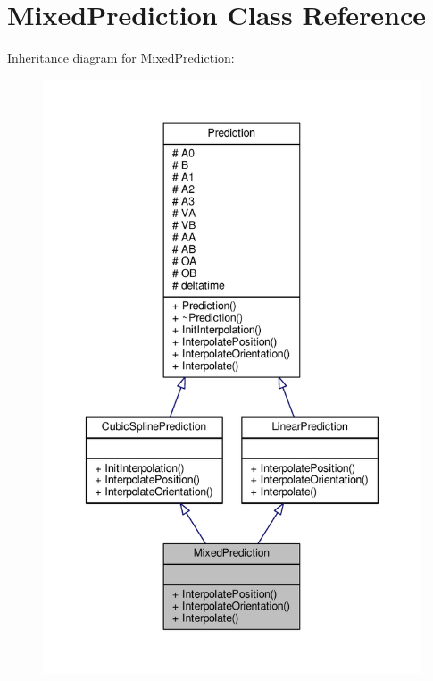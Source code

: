 \hypertarget{classMixedPrediction}{}\section{Mixed\+Prediction Class Reference}
\label{classMixedPrediction}


Inheritance diagram for Mixed\+Prediction\+:
\nopagebreak
\begin{figure}[H]
\begin{center}
\leavevmode
\includegraphics[width=348pt]{d3/d5d/classMixedPrediction__inherit__graph}
\end{center}
\end{figure}



